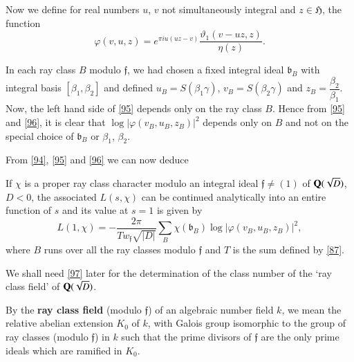 Now we define for real numbers $u$, $v$ not simultaneously integral
and $z\in\mathfrak{H}$, the function
$$
\varphi(v,u,z)=e^{\pi iu(uz-v)}\frac{\vartheta_{1}(v-uz,z)}{\eta(z)}.
$$

In each ray class $B$ modulo $\mathfrak{f}$, we had chosen a fixed
integral ideal $\mathfrak{b}_{B}$ with integral basis
$[\beta_{1},\beta_{2}]$ and defined $u_{B}=S(\beta_{1}\gamma)$,
$v_{B}=S(\beta_{2}\gamma)$ and
$z_{B}=\dfrac{\beta_{2}}{\beta_{1}}$. Now, the left hand side of
\eqref{95} depends only on the ray class $B$. Hence from \eqref{95}
and \eqref{96}, it is clear that
$\log|\varphi(v_{B},u_{B},z_{B})|^{2}$ depends only on $B$ and not on
the special choice of $\mathfrak{b}_{B}$ or $\beta_{1}$, $\beta_{2}$.

From \eqref{94}, \eqref{95} and \eqref{96} we can now deduce

\begin{thm}\label{thm9}
If $\chi$ is a proper ray class character modulo an integral ideal
$\mathfrak{f}\neq (1)$ of $\mathbf{Q}(\sqrt{D})$, $D<0$, the associated
$L(s,\chi)$ can be continued analytically into an entire function of
$s$ and its value at $s=1$ is given by
\begin{equation*}
L(1,\chi)=-\frac{2\pi}{Tw_{\mathfrak{f}}\sqrt{|D|}}\sum_{B}\chi(\mathfrak{b}_{B})\log|\varphi(v_{B},u_{B},z_{B})|^{2},\tag{97}\label{97}
\end{equation*}
where $B$ runs over all the ray classes modulo $\mathfrak{f}$ and $T$
is the sum defined by \eqref{87}.
\end{thm}

We shall need \eqref{97} later for the determination of the class
number of the `ray class field' of $\mathbf{Q}(\sqrt{D})$.

By the {\bf ray class field} (modulo $\mathfrak{f}$) of an algebraic
number field $k$, we mean the relative abelian extension $K_{0}$ of
$k$, with Galois group isomorphic to the group of ray classes (modulo
$\mathfrak{f}$) in $k$ such that the prime divisors of $\mathfrak{f}$
are the only prime ideals which are ramified in $K_{0}$.


